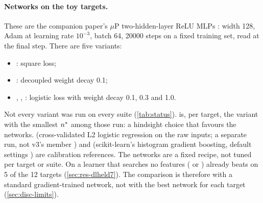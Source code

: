 \paragraph{Networks on the toy targets.} These are the companion paper's $\mu$P two-hidden-layer ReLU MLPs \cite{gdcircuit2026,yang2021feature}: width 128, Adam at learning rate $10^{-3}$, batch 64, 20000 steps on a fixed training set, read at the final step. There are five variants:
\begin{itemize}
\item {}: square loss;
\item {}: decoupled weight decay 0.1;
\item {}, , : logistic loss with weight decay 0.1, 0.3 and 1.0.
\end{itemize}
Not every variant was run on every suite (\cref{tab:status}).  is, per target, the variant with the smallest $n^{*}$ among those run: a hindsight choice that favours the networks.  (cross-validated L2 logistic regression on the raw inputs; a separate run, not v3's member ) and  (scikit-learn's histogram gradient boosting, default settings \cite{pedregosa2011sklearn}) are calibration references. The networks are a fixed recipe, not tuned per target or suite. On  a learner that searches no features ( or ) already beats  on 5 of the 12 targets (\cref{sec:res-dlheld7}). The comparison is therefore with a standard gradient-trained network, not with the best network for each target (\cref{sec:disc-limits}).

